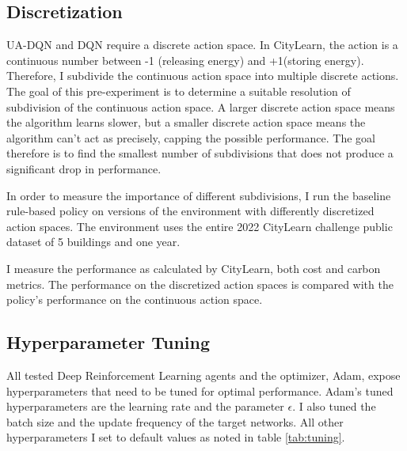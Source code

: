 \subsection{Discretization} \label{sec:discretization}
UA-DQN and DQN require a discrete action space.
In CityLearn, the action is a continuous number between -1 (releasing energy) and +1(storing energy).
Therefore, I subdivide the continuous action space into multiple discrete actions.
The goal of this pre-experiment is to determine a suitable resolution of subdivision of the continuous action space.
A larger discrete action space means the algorithm learns slower, but a smaller discrete action space means the algorithm can't act as precisely, capping the possible performance.
The goal therefore is to find the smallest number of subdivisions that does not produce a significant drop in performance.

In order to measure the importance of different subdivisions, I run the baseline rule-based policy on versions of the environment with differently discretized action spaces.
The environment uses the entire 2022 CityLearn challenge public dataset of 5 buildings and one year.

I measure the performance as calculated by CityLearn, both cost and carbon metrics.
The performance on the discretized action spaces is compared with the policy's performance on the continuous action space.

\subsection{Hyperparameter Tuning}
All tested Deep Reinforcement Learning agents and the optimizer, Adam, expose hyperparameters that need to be tuned for optimal performance.
Adam's tuned hyperparameters are the learning rate and the parameter $\epsilon$.
I also tuned the batch size and the update frequency of the target networks.
All other hyperparameters I set to default values as noted in table \ref{tab:tuning}.

